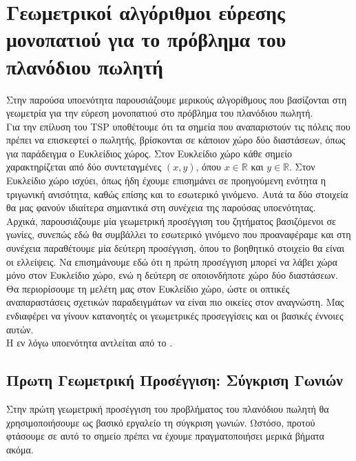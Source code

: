 \documentclass[oneside,12pt]{book}
\newcommand{\R}{\mathbb{R}}
\theoremstyle{definition}
\begin{document}
\section{Γεωμετρικοί αλγόριθμοι εύρεσης μονοπατιού για το πρόβλημα του πλανόδιου πωλητή}

Στην παρούσα υποενότητα παρουσιάζουμε μερικούς αλγορίθμους που βασίζονται στη γεωμετρία για την εύρεση μονοπατιού στο πρόβλημα του πλανόδιου πωλητή. \\

Για την επίλυση του TSP υποθέτουμε ότι τα σημεία που αναπαριστούν τις πόλεις που πρέπει να επισκεφτεί ο πωλητής, βρίσκονται σε κάποιον χώρο δύο διαστάσεων, όπως για παράδειγμα ο Ευκλείδιος χώρος. Στον Ευκλείδιο χώρο κάθε σημείο χαρακτηρίζεται από δύο συντεταγμένες \((x,y)\), όπου \(x \in \R\) και \(y \in \R\). Στον Ευκλείδιο χώρο ισχύει, όπως ήδη έχουμε επισημάνει σε προηγούμενη ενότητα η τριγωνική ανισότητα, καθώς επίσης και το εσωτερικό γινόμενο. Αυτά τα δύο στοιχεία θα μας φανούν ιδιαίτερα σημαντικά στη συνέχεια της παρούσας υποενότητας. \\

Αρχικά, παρουσιάζουμε μία γεωμετρική προσέγγιση του ζητήματος βασιζόμενοι σε γωνίες, συνεπώς εδώ θα συμβάλλει το εσωτερικό γινόμενο που προαναφέραμε και στη συνέχεια παραθέτουμε μία δεύτερη προσέγγιση, όπου το βοηθητικό στοιχείο θα είναι οι ελλείψεις. Να επισημάνουμε εδώ ότι η πρώτη προσέγγιση μπορεί να λάβει χώρα μόνο στον Ευκλείδιο χώρο, ενώ η δεύτερη σε οποιονδήποτε χώρο δύο διαστάσεων. Θα περιορίσουμε τη μελέτη μας στον Ευκλείδιο χώρο, ώστε οι οπτικές αναπαραστάσεις σχετικών παραδειγμάτων να είναι πιο οικείες στον αναγνώστη. Μας ενδιαφέρει να γίνουν κατανοητές οι γεωμετρικές προσεγγίσεις και οι βασικές έννοιες αυτών. \\

Η εν λόγω υποενότητα αντλείται από το \cite{16}.

\subsection{Πρωτη Γεωμετρική Προσέγγιση: Σύγκριση Γωνιών}

Στην πρώτη γεωμετρική προσέγγιση του προβλήματος του πλανόδιου πωλητή θα χρησιμοποιήσουμε ως βασικό εργαλείο τη σύγκριση γωνιών. Ωστόσο, προτού φτάσουμε σε αυτό το σημείο πρέπει να έχουμε πραγματοποιήσει μερικά βήματα ακόμα. \\
\end{document}
